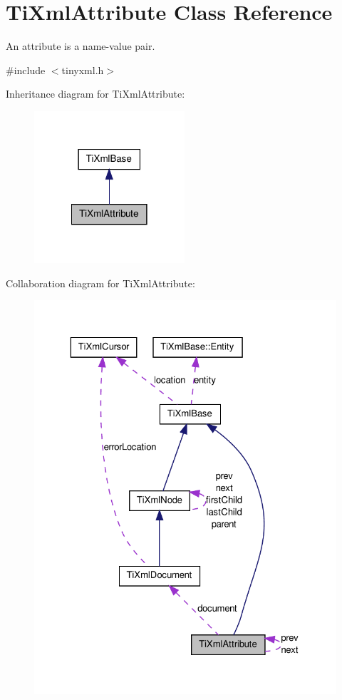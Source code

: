 \hypertarget{classTiXmlAttribute}{
\section{TiXmlAttribute Class Reference}
\label{d4/dc1/classTiXmlAttribute}
}


An attribute is a name-\/value pair.  




{\ttfamily \#include $<$tinyxml.h$>$}



Inheritance diagram for TiXmlAttribute:
\nopagebreak
\begin{figure}[H]
\begin{center}
\leavevmode
\includegraphics[width=158pt]{d3/d04/classTiXmlAttribute__inherit__graph}
\end{center}
\end{figure}


Collaboration diagram for TiXmlAttribute:
\nopagebreak
\begin{figure}[H]
\begin{center}
\leavevmode
\includegraphics[width=325pt]{d2/d75/classTiXmlAttribute__coll__graph}
\end{center}
\end{figure}
